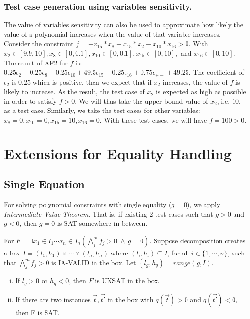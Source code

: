 \documentclass[runningheads,a4paper,oribibl]{llncs}
\newcommand{\suppress}[1]{} %
\begin{document}
\subsubsection*{Test case generation using variables sensitivity.}
\sloppy
The value of variables sensitivity can also be used to approximate how likely the value of a polynomial increases when the value of that variable increases. Consider the constraint $f = -x_{15}*x_8+x_{15}*x_2-x_{10}*x_{16}>0$. With ${x_2 \in [9.9, 10]}, {x_8 \in [0, 0.1]}, {x_{10} \in [0, 0.1]}, {x_{15} \in [0, 10]},$ and $ x_{16} \in [0, 10]$. The result of AF2 for $f$ is: $0.25 \epsilon_2 - 0.25 \epsilon_8 - 0.25 \epsilon_{10} + 49.5\epsilon_{15} - 0.25\epsilon_{16} + 0.75\epsilon_{+-} + 49.25$. The coefficient of $\epsilon_2$ is $0.25$ which is positive, then we expect that if $x_2$ increases, the value of $f$ is likely to increase.  As the result, the test case of $x_2$ is expected as high as possible in order to satisfy $f>0$. We will thus take the upper bound value of $x_2$, i.e. $10$, as a test case. Similarly, we take the test cases for other variables: $x_8=0, x_{10}=0, x_{15}=10, x_{16}=0$. With these test cases, we will have $f=100 > 0$.

\suppress{
I. Selecting API for testing:
  (1) Difficulty first by SAT-likelihood.   
  (2) Easy first by SAT-likelihood
  (10) Random.,
II. Selecting Variable:
  (8) With sensitivity
  (9) Without sensitivity - Random: 
III. Selecting box:
  (3) SAT-directed using IA-Testing.
  (4) UNSAT-directed using IA-Testing.
  (5) SAT-directed using SAT-likelihood
  (6) UNSAT-directed using SAT-likelihood
  (7) Random
}


\section{Extensions for Equality Handling} \label{sec:eq}
\subsection*{Single Equation}
For solving polynomial constraints with single equality ($g=0$), we apply {\em Intermediate Value Theorem}. 
That is, if existing 2 test cases such that $g > 0$ and $g < 0$, then $g=0$ is SAT somewhere in between. 

\begin{lemma} \label{lemma:ivt}
For $F = \exists x_1 \in I_1 \cdots x_n \in I_n (\bigwedge \limits_{j}^m f_j > 0~\wedge~g = 0)$. Suppose decomposition creates a box $I = (l_1, h_1) \times \cdots \times (l_n, h_n)$ where $(l_i, h_i) \subseteq I_i$ for all $i \in \{1, \cdots, n\}$, such that $\bigwedge \limits_{j}^m f_j > 0$ is IA-VALID in the box. Let $(l_g, h_g) = range(g, I)$.
\begin{enumerate}[(i)]
\item If $l_g > 0$ or $h_g < 0$, then $F$ is UNSAT in the box. 
\item If there are two instances $\vec{t},\vec{t'}$ in the box with $g(\vec{t}) > 0$ and $g(\vec{t'}) < 0$, then F is SAT.
\end{enumerate}
\end{lemma}
\end{document}
